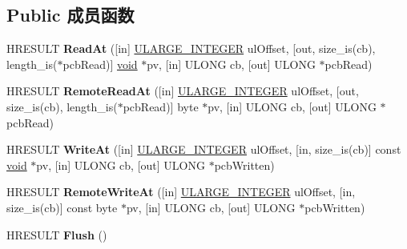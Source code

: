 \subsection*{Public 成员函数}
\begin{DoxyCompactItemize}
\item 
\mbox{\label{interface_i_lock_bytes_ad381df39c1d72828f22fb8e0a4e0fc28}} 
H\+R\+E\+S\+U\+LT {\bfseries Read\+At} (\mbox{[}in\mbox{]} \hyperlink{struct___u_l_a_r_g_e___i_n_t_e_g_e_r}{U\+L\+A\+R\+G\+E\+\_\+\+I\+N\+T\+E\+G\+ER} ul\+Offset, \mbox{[}out, size\+\_\+is(cb), length\+\_\+is($\ast$pcb\+Read)\mbox{]} \hyperlink{interfacevoid}{void} $\ast$pv, \mbox{[}in\mbox{]} U\+L\+O\+NG cb, \mbox{[}out\mbox{]} U\+L\+O\+NG $\ast$pcb\+Read)
\item 
\mbox{\label{interface_i_lock_bytes_a24b3813965679de4b80418be20658249}} 
H\+R\+E\+S\+U\+LT {\bfseries Remote\+Read\+At} (\mbox{[}in\mbox{]} \hyperlink{struct___u_l_a_r_g_e___i_n_t_e_g_e_r}{U\+L\+A\+R\+G\+E\+\_\+\+I\+N\+T\+E\+G\+ER} ul\+Offset, \mbox{[}out, size\+\_\+is(cb), length\+\_\+is($\ast$pcb\+Read)\mbox{]} byte $\ast$pv, \mbox{[}in\mbox{]} U\+L\+O\+NG cb, \mbox{[}out\mbox{]} U\+L\+O\+NG $\ast$pcb\+Read)
\item 
\mbox{\label{interface_i_lock_bytes_a8cf4266df159541e420edf3b4c9a1fe4}} 
H\+R\+E\+S\+U\+LT {\bfseries Write\+At} (\mbox{[}in\mbox{]} \hyperlink{struct___u_l_a_r_g_e___i_n_t_e_g_e_r}{U\+L\+A\+R\+G\+E\+\_\+\+I\+N\+T\+E\+G\+ER} ul\+Offset, \mbox{[}in, size\+\_\+is(cb)\mbox{]} const \hyperlink{interfacevoid}{void} $\ast$pv, \mbox{[}in\mbox{]} U\+L\+O\+NG cb, \mbox{[}out\mbox{]} U\+L\+O\+NG $\ast$pcb\+Written)
\item 
\mbox{\label{interface_i_lock_bytes_ac49f2fc0c929dada777649ab0d9bb9d6}} 
H\+R\+E\+S\+U\+LT {\bfseries Remote\+Write\+At} (\mbox{[}in\mbox{]} \hyperlink{struct___u_l_a_r_g_e___i_n_t_e_g_e_r}{U\+L\+A\+R\+G\+E\+\_\+\+I\+N\+T\+E\+G\+ER} ul\+Offset, \mbox{[}in, size\+\_\+is(cb)\mbox{]} const byte $\ast$pv, \mbox{[}in\mbox{]} U\+L\+O\+NG cb, \mbox{[}out\mbox{]} U\+L\+O\+NG $\ast$pcb\+Written)
\item 
\mbox{\label{interface_i_lock_bytes_a9b559d9e1a2690a0bf46f027824fe4fb}} 
H\+R\+E\+S\+U\+LT {\bfseries Flush} ()

\end{DoxyCompactItemize}
